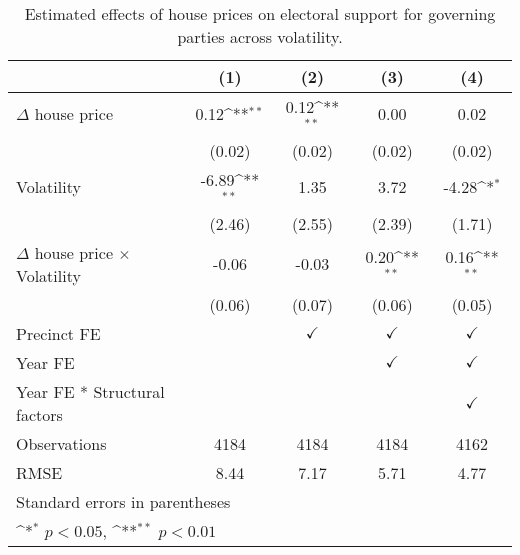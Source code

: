 \begin{table}[htbp]\centering
\def\sym#1{\ifmmode^{#1}\else\(^{#1}\)\fi}
\caption{Estimated effects of house prices on electoral support for governing parties across volatility.} \label{tab5}
\begin{tabular}{l*{4}{c}}
\hline\hline
                    &\multicolumn{1}{c}{(1)}        &\multicolumn{1}{c}{(2)}        &\multicolumn{1}{c}{(3)}        &\multicolumn{1}{c}{(4)}        \\
\hline
$\Delta$ house price&        0.12\sym{**}&        0.12\sym{**}&        0.00        &        0.02        \\
                    &      (0.02)        &      (0.02)        &      (0.02)        &      (0.02)        \\
[1em]
Volatility          &       -6.89\sym{**}&        1.35        &        3.72        &       -4.28\sym{*} \\
                    &      (2.46)        &      (2.55)        &      (2.39)        &      (1.71)        \\
[1em]
$\Delta$ house price $\times$ Volatility&       -0.06        &       -0.03        &        0.20\sym{**}&        0.16\sym{**}\\
                    &      (0.06)        &      (0.07)        &      (0.06)        &      (0.05)        \\
[1em]
\hline Precinct FE  &                    &$\checkmark$        &$\checkmark$        &$\checkmark$        \\
[1em]
Year FE             &                    &                    &$\checkmark$        &$\checkmark$        \\
[1em]
Year FE * Structural factors&                    &                    &                    &$\checkmark$        \\
\hline
Observations        &        4184        &        4184        &        4184        &        4162        \\
RMSE                &        8.44        &        7.17        &        5.71        &        4.77        \\
\hline\hline
\multicolumn{5}{l}{\footnotesize Standard errors in parentheses}\\
\multicolumn{5}{l}{\footnotesize \sym{*} \(p<0.05\), \sym{**} \(p<0.01\)}\\
\end{tabular}
\end{table}
